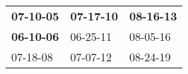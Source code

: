 \begin{supertabular}{p{0.33\columnwidth}p{0.33\columnwidth}p{0.33\columnwidth}}
 \textbf{07-10-05\textsuperscript{}} &  \textbf{07-17-10\textsuperscript{}} &  \textbf{08-16-13\textsuperscript{}} \\
 \textbf{06-10-06\textsuperscript{}} &           06-25-11\textsuperscript{} &           08-05-16\textsuperscript{} \\
          07-18-08\textsuperscript{} &           07-07-12\textsuperscript{} &           08-24-19\textsuperscript{} \\
\end{supertabular}
